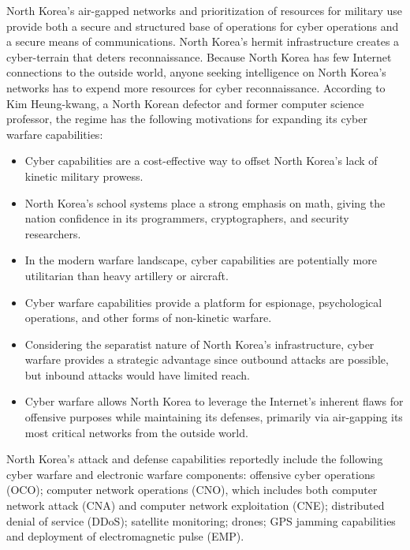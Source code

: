 \documentclass[12pt]{article}
\begin{document}
        North Korea’s air-gapped networks and prioritization of resources for military use provide both a secure and structured base of operations for cyber operations and a secure means of communications. North Korea’s hermit infrastructure creates a cyber-terrain that deters reconnaissance. Because North Korea has few Internet connections to the outside world, anyone seeking intelligence on North Korea’s networks has to expend more resources for cyber reconnaissance. According to Kim Heung-kwang, a North Korean defector and former computer science professor, the regime has the following motivations for expanding its cyber warfare capabilities:
        \begin{itemize}
        \item Cyber capabilities are a cost-effective way to offset North Korea’s lack of kinetic military prowess.
        \item North Korea’s school systems place a strong emphasis on math, giving the nation confidence in its programmers, cryptographers, and security researchers.
        \item In the modern warfare landscape, cyber capabilities are potentially more utilitarian than heavy artillery or aircraft.
        \item Cyber warfare capabilities provide a platform for espionage, psychological operations, and other forms of non-kinetic warfare.
        \item Considering the separatist nature of North Korea’s infrastructure, cyber warfare provides a strategic advantage since outbound attacks are possible, but inbound attacks would have limited reach.
        \item Cyber warfare allows North Korea to leverage the Internet’s inherent flaws for offensive purposes while maintaining its defenses, primarily via air-gapping its most critical networks from the outside world.
        \end{itemize}
        
        North Korea’s attack and defense capabilities reportedly include the following cyber warfare and electronic warfare components: offensive cyber operations (OCO); computer network operations (CNO), which includes both computer network attack (CNA) and computer network exploitation (CNE); distributed denial of service (DDoS); satellite monitoring; drones; GPS jamming capabilities and deployment of electromagnetic pulse (EMP).
        
\end{document}
